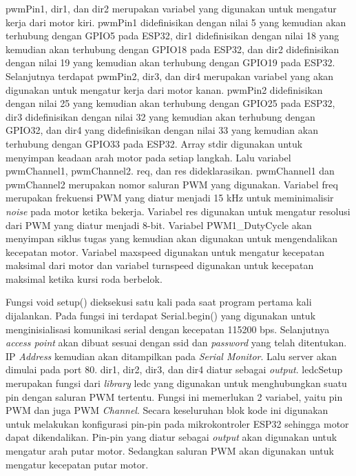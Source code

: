 pwmPin1, dir1, dan dir2 merupakan variabel yang digunakan untuk mengatur kerja dari motor kiri. pwmPin1 didefinisikan dengan nilai 5 yang kemudian akan terhubung dengan GPIO5 pada ESP32, dir1 didefinisikan dengan nilai 18 yang kemudian akan terhubung dengan GPIO18 pada ESP32, dan dir2 didefinisikan dengan nilai 19 yang kemudian akan terhubung dengan GPIO19 pada ESP32. Selanjutnya terdapat pwmPin2, dir3, dan dir4 merupakan variabel yang akan digunakan untuk mengatur kerja dari motor kanan. pwmPin2 didefinisikan dengan nilai 25 yang kemudian akan terhubung dengan GPIO25 pada ESP32, dir3 didefinisikan dengan nilai 32 yang kemudian akan terhubung dengan GPIO32, dan dir4 yang didefinisikan dengan nilai 33 yang kemudian akan terhubung dengan GPIO33 pada ESP32. Array stdir digunakan untuk menyimpan keadaan arah motor pada setiap langkah. Lalu variabel pwmChannel1, pwmChannel2. req, dan res dideklarasikan. pwmChannel1 dan pwmChannel2 merupakan nomor saluran PWM yang digunakan. Variabel freq merupakan frekuensi PWM yang diatur menjadi 15 kHz untuk meminimalisir \emph{noise} pada motor ketika bekerja. Variabel res digunakan untuk mengatur resolusi dari PWM yang diatur menjadi 8-bit. Variabel PWM1\_DutyCycle akan menyimpan siklus tugas yang kemudian akan digunakan untuk mengendalikan kecepatan motor. Variabel maxspeed digunakan untuk mengatur kecepatan maksimal dari motor dan variabel turnspeed digunakan untuk kecepatan maksimal ketika kursi roda berbelok.

Fungsi void setup() dieksekusi satu kali pada saat program pertama kali dijalankan. Pada fungsi ini terdapat Serial.begin() yang digunakan untuk menginisialisasi komunikasi serial dengan kecepatan 115200 bps. Selanjutnya \emph{access point} akan dibuat sesuai dengan ssid dan \emph{password} yang telah ditentukan. IP \emph{Address} kemudian akan ditampilkan pada \emph{Serial Monitor}. Lalu server akan dimulai pada port 80. dir1, dir2, dir3, dan dir4 diatur sebagai \emph{output}. ledcSetup merupakan fungsi dari \emph{library} ledc yang digunakan untuk menghubungkan suatu pin dengan saluran PWM tertentu. Fungsi ini memerlukan 2 variabel, yaitu pin PWM dan juga PWM \emph{Channel}. Secara keseluruhan blok kode ini digunakan untuk melakukan konfigurasi pin-pin pada mikrokontroler ESP32 sehingga motor dapat dikendalikan. Pin-pin yang diatur sebagai \emph{output} akan digunakan untuk mengatur arah putar motor. Sedangkan saluran PWM akan digunakan untuk mengatur kecepatan putar motor.

